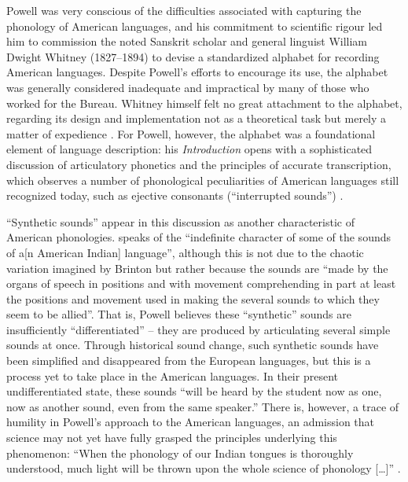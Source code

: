 \documentclass[output=paper]{langscibook}
\begin{document}
Powell was very conscious of the difficulties associated with capturing the phonology of American languages, and his commitment to scientific rigour led him to commission the noted Sanskrit scholar and general linguist William Dwight Whitney (1827--1894) to devise a standardized alphabet for recording American languages. Despite Powell's efforts to encourage its use, the alphabet was generally considered inadequate and impractical by many of those who worked for the Bureau. Whitney himself felt no great attachment to the alphabet, regarding its design and implementation not as a theoretical task but merely a matter of expedience \citep[see][50--51]{Darnell1998}. For Powell, however, the alphabet was a foundational element of language description: his \emph{Introduction} opens with a sophisticated discussion of articulatory phonetics and the principles of accurate transcription, which observes a number of phonological peculiarities of American languages still recognized today, such as ejective consonants (``interrupted sounds'') \citep[1--16]{Powell18801877}.

``Synthetic sounds'' appear in this discussion as another characteristic of American phonologies. \citet[12]{Powell18801877} speaks of the ``indefinite character of some of the sounds of a[n American Indian] language'', although this is not due to the chaotic variation imagined by Brinton but rather because the sounds are ``made by the organs of speech in positions and with movement comprehending in part at least the positions and movement used in making the several sounds to which they seem to be allied''. That is, Powell believes these ``synthetic'' sounds are insufficiently ``differentiated'' -- they are produced by articulating several simple sounds at once. Through historical sound change, such synthetic sounds have been simplified and disappeared from the European languages, but this is a process yet to take place in the American languages. In their present undifferentiated state, these sounds ``will be heard by the student now as one, now as another sound, even from the same speaker.'' There is, however, a trace of humility in Powell's approach to the American languages, an admission that science may not yet have fully grasped the principles underlying this phenomenon: ``When the phonology of our Indian tongues is thoroughly understood, much light will be thrown upon the whole science of phonology […]'' \citep[13]{Powell18801877}.
\end{document}
